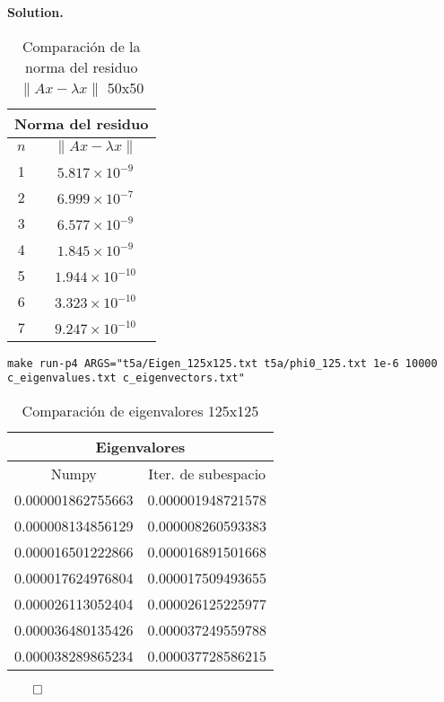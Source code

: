 \documentclass{article}
\theoremstyle{problemstyle}
\newenvironment{solution}{%
  \begin{mdframed}[linewidth=0.8pt,linecolor=Gray,backgroundcolor=Gray!5,roundcorner=5pt]%
  \noindent\textbf{Solution.}%
}{%
\hfill $ \qed $ 
  \end{mdframed}%
}
\begin{document}
\begin{solution}
\begin{table}[H]
    \begin{center}
        \begin{tabular}{|c|c|}
            \multicolumn{2}{c}{Norma del residuo} \\
            \hline
            $n$ & $\lVert Ax - \lambda x \rVert$ \\
            \hline
            1 & $5.817 \times 10^{-9}$ \\
            \hline
            2 & $6.999 \times 10^{-7}$ \\
            \hline
            3 & $6.577 \times 10^{-9}$ \\
            \hline
            4 & $1.845 \times 10^{-9}$ \\
            \hline
            5 & $1.944 \times 10^{-10}$ \\
            \hline
            6 & $3.323 \times 10^{-10}$ \\
            \hline
            7 & $9.247 \times 10^{-10}$ \\
            \hline
        \end{tabular}
    \end{center}
    \caption{Comparaci\'on de la norma del residuo $\lVert Ax - \lambda x \rVert$ 50x50}\label{tab:residual_norms_varied}
\end{table}

  
\begin{center}
  \texttt{make run-p4 ARGS="t5a/Eigen\_125x125.txt t5a/phi0\_125.txt 1e-6 10000 c\_eigenvalues.txt c\_eigenvectors.txt"}
\end{center}

\begin{table}[H]
    \begin{center}
        \begin{tabular}{|c|c|}
            \multicolumn{2}{c}{Eigenvalores}   \\
            \hline
            Numpy             & Iter. de subespacio\\
            \hline

            0.000001862755663 & 0.000001948721578 \\
            \hline
            0.000008134856129 & 0.000008260593383 \\
            \hline
            0.000016501222866 & 0.000016891501668 \\
            \hline
            0.000017624976804 & 0.000017509493655 \\
            \hline
            0.000026113052404 & 0.000026125225977 \\
            \hline
            0.000036480135426 & 0.000037249559788 \\
            \hline
            0.000038289865234 & 0.000037728586215 \\
            \hline
        \end{tabular}
    \end{center}
    \caption{Comparaci\'on de eigenvalores 125x125}\label{tab:evals_comparison_small4}
\end{table}



\end{solution}
\end{document}
